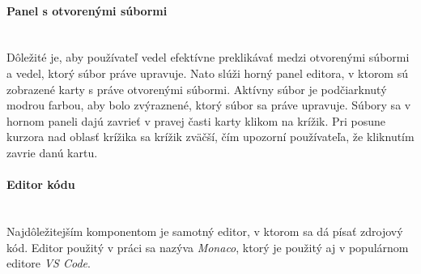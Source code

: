 \paragraph{Panel s otvorenými súbormi}\leavevmode\\
Dôležité je, aby používateľ vedel efektívne preklikávať medzi otvorenými súbormi a vedel, ktorý
súbor práve upravuje. Nato slúži horný panel editora, v ktorom sú zobrazené karty s práve otvorenými
súbormi. Aktívny súbor je podčiarknutý modrou farbou, aby bolo zvýraznené, ktorý súbor sa práve
upravuje. Súbory sa v hornom paneli dajú zavrieť v pravej časti karty klikom na krížik. Pri posune
kurzora nad oblasť krížika sa krížik zväčší, čím upozorní používateľa, že kliknutím zavrie danú
kartu.

\paragraph{Editor kódu}\leavevmode\\
Najdôležitejším komponentom je samotný editor, v ktorom sa dá písať zdrojový kód. Editor použitý v
práci sa nazýva \textit{Monaco}, ktorý je použitý aj v populárnom editore \textit{VS Code}. 

